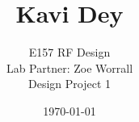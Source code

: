 \documentclass[letterpaper,12pt]{article}
\begin{document}
\title{\vspace{-2cm} Kavi Dey}
\author{\vspace{-0.4cm} E157 RF Design \\ Lab Partner: Zoe Worrall \\ Design Project 1}
\date{\vspace{-0.4cm} \today}
\maketitle



\end{document}
